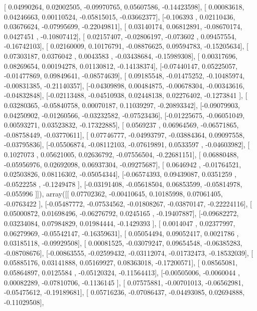 \documentclass{article}
\begin{document}
       [ 0.04990264,  0.02002505, -0.09970765,  0.05607586, -0.14423598],
       [ 0.00083618,  0.04246663,  0.00110524, -0.05815015, -0.03662377],
       [-0.106393  ,  0.02110436,  0.03676624, -0.07995699, -0.22049811],
       [ 0.03140174,  0.06812891, -0.08670174,  0.0427451 , -0.10807412],
       [ 0.02157407, -0.02806197, -0.073602  ,  0.09457554, -0.16742103],
       [ 0.02160009,  0.10176791, -0.08876625,  0.09594783, -0.15205634],
       [ 0.07303187,  0.0376042 ,  0.0043583 , -0.03438684, -0.15989308],
       [ 0.00317696,  0.08269654,  0.00194278,  0.01130812, -0.14138374],
       [-0.07440147,  0.05225057, -0.01477869,  0.09849641, -0.08574639],
       [ 0.09185548, -0.01475252, -0.10485974, -0.00831385, -0.21140357],
       [-0.04309898,  0.00484875, -0.00678304, -0.00343616, -0.04832848],
       [-0.02113488, -0.04510938,  0.02448138,  0.02276402, -0.1273841 ],
       [ 0.03280365, -0.05840758,  0.00070187,  0.11039297, -0.20893342],
       [-0.09079903,  0.04250902, -0.01260566, -0.03232582, -0.07523436],
       [-0.01225675, -0.06051049,  0.00593271,  0.03523832, -0.17322885],
       [ 0.0569237 ,  0.06964569, -0.06571865, -0.08758449, -0.03770611],
       [ 0.07746777, -0.04993797, -0.03884364,  0.09097558, -0.03795836],
       [-0.05506874, -0.08112103, -0.07619891,  0.0533597 , -0.04603982],
       [ 0.1027073 ,  0.05621005,  0.02636792, -0.07556504, -0.22681151],
       [ 0.06880488, -0.05956976,  0.02692098,  0.06937304, -0.09275687],
       [ 0.0646942 , -0.01764521,  0.02503826,  0.08116302, -0.05054344],
       [-0.06574393,  0.09439087,  0.0351259 , -0.0522258 , -0.1249478 ],
       [-0.03191408, -0.05618504,  0.06853599, -0.05814978, -0.055996  ]]), array([[ 0.07702362, -0.00410645,  0.10185998,  0.07061405, -0.0763422 ],
       [-0.05487772, -0.07534562, -0.01808267, -0.03870147, -0.22224116],
       [ 0.05000872,  0.01698496, -0.06276792,  0.0245165 , -0.19407887],
       [-0.09682272,  0.03234084,  0.07984829,  0.01984444, -0.1429393 ],
       [ 0.0014047 ,  0.02377997,  0.06279969, -0.05542147, -0.16359631],
       [ 0.05054494,  0.09052417,  0.0021786 ,  0.03185118, -0.09929508],
       [ 0.00081525, -0.03079247,  0.09654548, -0.06385283, -0.08708676],
       [-0.00863555, -0.02599432, -0.03112074, -0.01732473, -0.18532039],
       [ 0.05885176,  0.03141888,  0.05169927,  0.08363018, -0.17200571],
       [ 0.08565081,  0.05864897,  0.0125584 , -0.05120324, -0.11564413],
       [-0.00505006, -0.0060044 ,  0.00082289, -0.07810706, -0.1136145 ],
       [ 0.07575881, -0.00701013, -0.06562981, -0.05475612, -0.19189681],
       [ 0.05716236, -0.07086437, -0.04493085,  0.02694888, -0.11029508],
\end{document}
